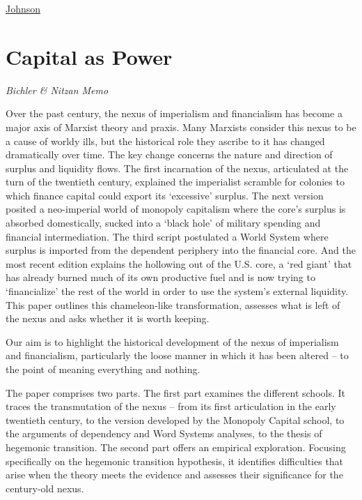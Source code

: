 \documentclass[
]{book}
\begin{document}
\href{https://phenomenalworld.org/analysis/reconstruction-finance}{Johnson}

\hypertarget{capital-as-power}{%
\section{Capital as Power}\label{capital-as-power}}

\emph{Bichler \& Nitzan Memo}

Over the past century, the nexus of imperialism and financialism has become a major axis
of Marxist theory and praxis. Many Marxists consider this nexus to be a cause of worldy
ills, but the historical role they ascribe to it has changed dramatically over time. The key
change concerns the nature and direction of surplus and liquidity flows. The first
incarnation of the nexus, articulated at the turn of the twentieth century, explained the
imperialist scramble for colonies to which finance capital could export its `excessive'
surplus. The next version posited a neo-imperial world of monopoly capitalism where the
core's surplus is absorbed domestically, sucked into a `black hole' of military spending
and financial intermediation. The third script postulated a World System where surplus is
imported from the dependent periphery into the financial core. And the most recent
edition explains the hollowing out of the U.S. core, a `red giant' that has already burned
much of its own productive fuel and is now trying to `financialize' the rest of the world in
order to use the system's external liquidity. This paper outlines this chameleon-like
transformation, assesses what is left of the nexus and asks whether it is worth keeping.

Our aim is to highlight the historical development of the
nexus of imperialism and financialism,
particularly the loose manner in which it has been altered --
to the point of meaning everything and nothing.

The paper comprises two parts. The first part examines the different schools. It
traces the transmutation of the nexus -- from its first articulation in the early twentieth
century, to the version developed by the Monopoly Capital school, to the arguments of
dependency and Word Systems analyses, to the thesis of hegemonic transition. The
second part offers an empirical exploration. Focusing specifically on the hegemonic
transition hypothesis, it identifies difficulties that arise when the theory meets the
evidence and assesses their significance for the century-old nexus.
\end{document}
